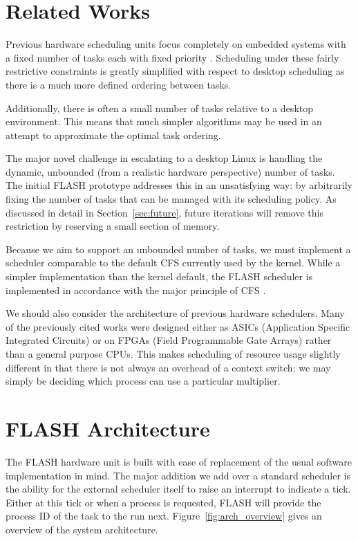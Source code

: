 \documentclass{sig-alternate-10pt}
\begin{document}
\section{Related Works}
\label{sec:related_works}
Previous hardware scheduling units focus completely on embedded systems with
a fixed number of tasks each with fixed priority
\cite{kuacharoen2003configurable, morton2004hardware, nacul2007hardware, nakano1995hardware,
park2008hardware}.  Scheduling under these fairly restrictive constraints is
greatly simplified with respect to desktop scheduling as there is a much
more defined ordering between tasks.

Additionally, there is often a small number of tasks relative to a desktop
environment.  This means that much simpler algorithms may be used in an
attempt to approximate the optimal task ordering.

The major novel challenge in escalating to a desktop Linux is handling the
dynamic, unbounded (from a realistic hardware perspective) number of tasks.
The initial FLASH prototype addresses this in an unsatisfying way: by
arbitrarily fixing the number of tasks that can be managed with its
scheduling policy.  As discussed in detail in Section~\ref{sec:future},
future iterations will remove this restriction by reserving a small section
of memory.

Because we aim to support an unbounded number of tasks, we must implement
a scheduler comparable to the default CFS currently used by the kernel.
While a simpler implementation than the kernel default, the FLASH scheduler
is implemented in accordance with the major principle of CFS
\cite{wong2008cfs}.

We should also consider the architecture of previous hardware schedulers.
Many of the previously cited works were designed either as ASICs
(Application Specific Integrated Circuits) or on FPGAs (Field Programmable
Gate Arrays) rather than a general purpose CPUs.  This makes scheduling of
resource usage slightly different in that there is not always an overhead of
a context switch: we may simply be deciding which process can use
a particular multiplier.


\section{FLASH Architecture}
\label{sec:arch}
The FLASH hardware unit is built with ease of replacement of the usual
software implementation in mind.  The major addition we add over a standard
scheduler is the ability for the external scheduler itself to raise an
interrupt to indicate a tick. Either at this tick or when a process is
requested, FLASH will provide the process ID of the task to the run next.
Figure~\ref{fig:arch_overview} gives an overview of the system architecture.
\end{document}
